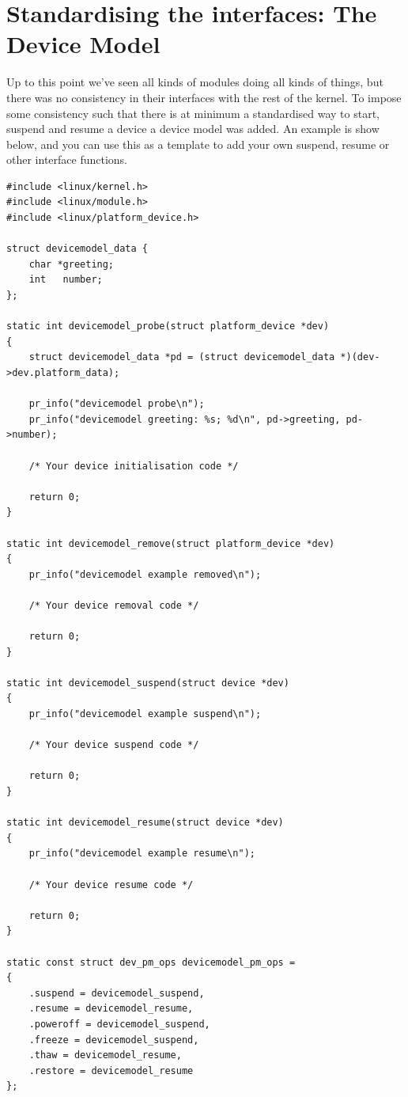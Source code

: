 \documentclass[11pt]{article}
\begin{document}
\section*{Standardising the interfaces: The Device Model}
\label{sec:org2c0e1c9}
Up to this point we've seen all kinds of modules doing all kinds of things, but there was no consistency in their interfaces with the rest of the kernel. To impose some consistency such that there is at minimum a standardised way to start, suspend and resume a device a device model was added. An example is show below, and you can use this as a template to add your own suspend, resume or other interface functions.

\begin{verbatim}
#include <linux/kernel.h>
#include <linux/module.h>
#include <linux/platform_device.h>

struct devicemodel_data {
    char *greeting;
    int   number;
};

static int devicemodel_probe(struct platform_device *dev)
{
    struct devicemodel_data *pd = (struct devicemodel_data *)(dev->dev.platform_data);

    pr_info("devicemodel probe\n");
    pr_info("devicemodel greeting: %s; %d\n", pd->greeting, pd->number);

    /* Your device initialisation code */

    return 0;
}

static int devicemodel_remove(struct platform_device *dev)
{
    pr_info("devicemodel example removed\n");

    /* Your device removal code */

    return 0;
}

static int devicemodel_suspend(struct device *dev)
{
    pr_info("devicemodel example suspend\n");

    /* Your device suspend code */

    return 0;
}

static int devicemodel_resume(struct device *dev)
{
    pr_info("devicemodel example resume\n");

    /* Your device resume code */

    return 0;
}

static const struct dev_pm_ops devicemodel_pm_ops =
{
    .suspend = devicemodel_suspend,
    .resume = devicemodel_resume,
    .poweroff = devicemodel_suspend,
    .freeze = devicemodel_suspend,
    .thaw = devicemodel_resume,
    .restore = devicemodel_resume
};


\end{verbatim}
\end{document}
